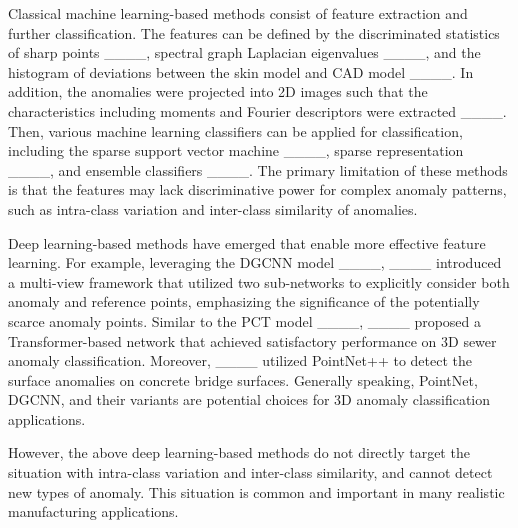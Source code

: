 Classical machine learning-based methods consist of feature extraction and further classification. The features can be defined by the discriminated statistics of sharp points ____, spectral graph Laplacian eigenvalues ____, and the histogram of deviations between the skin model and CAD model ____. In addition, the anomalies were projected into 2D images such that the characteristics including moments and Fourier descriptors were extracted ____. Then, various machine learning classifiers can be applied for classification, including the sparse support vector machine ____, sparse representation ____, and ensemble classifiers ____. The primary limitation of these methods is that the features may lack discriminative power for complex anomaly patterns, such as intra-class variation and inter-class similarity of anomalies.

Deep learning-based methods have emerged that enable more effective feature learning.
For example, leveraging the DGCNN model ____, ____ introduced a multi-view framework that utilized two sub-networks to explicitly consider both anomaly and reference points, emphasizing the significance of the potentially scarce anomaly points.  Similar to the PCT model ____, ____ proposed a Transformer-based network that achieved satisfactory performance on 3D sewer anomaly classification. Moreover, ____ utilized PointNet++ to detect the surface anomalies on concrete bridge surfaces. Generally speaking, PointNet, DGCNN, and their variants are potential choices for 3D anomaly classification applications. 

However, the above deep learning-based methods do not directly target the situation with intra-class variation and inter-class similarity, and cannot detect new types of anomaly. This situation is common and important in many realistic manufacturing applications.

